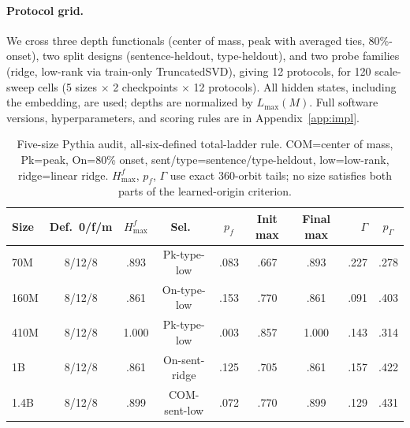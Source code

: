 \documentclass[11pt]{article}
\begin{document}
\paragraph{Protocol grid.} We cross three depth functionals (center of mass, peak with averaged ties, 80\%-onset), two split designs (sentence-heldout, type-heldout), and two probe families (ridge, low-rank via train-only TruncatedSVD), giving 12 protocols, for 120 scale-sweep cells (5 sizes $\times$ 2 checkpoints $\times$ 12 protocols). All hidden states, including the embedding, are used; depths are normalized by $L_{\max}(M)$. Full software versions, hyperparameters, and scoring rules are in Appendix~\ref{app:impl}.

\begin{table}[t]
\centering\footnotesize
\setlength{\tabcolsep}{4pt}
\begin{tabular}{lccccccrc}
\toprule
Size & Def.\ 0/f/m & $H^f_{\max}$ & Sel.\ & $p_f$ & Init max & Final max & $\Gamma$ & $p_\Gamma$ \\
\midrule
70M   & 8/12/8 & .893  & Pk-type-low   & .083 & .667 & .893  & .227 & .278 \\
160M  & 8/12/8 & .861  & On-type-low   & .153 & .770 & .861  & .091 & .403 \\
410M  & 8/12/8 & 1.000 & Pk-type-low   & .003 & .857 & 1.000 & .143 & .314 \\
1B    & 8/12/8 & .861  & On-sent-ridge & .125 & .705 & .861  & .157 & .422 \\
1.4B  & 8/12/8 & .899  & COM-sent-low  & .072 & .770 & .899  & .129 & .431 \\
\bottomrule
\end{tabular}
\caption{Five-size Pythia audit, all-six-defined total-ladder rule. COM=center of mass, Pk=peak, On=80\% onset, sent/type=sentence/type-heldout, low=low-rank, ridge=linear ridge. $H^f_{\max}$, $p_f$, $\Gamma$ use exact 360-orbit tails; no size satisfies both parts of the learned-origin criterion.}
\label{tab:scale}
\end{table}
\end{document}
